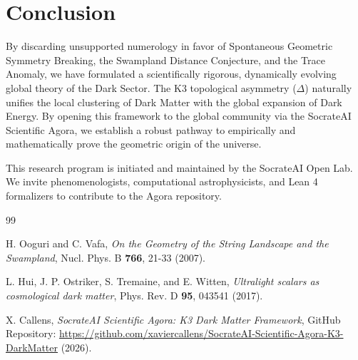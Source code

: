 \documentclass[aps,prd,twocolumn,nofootinbib,superscriptaddress,10pt]{revtex4-2}
\begin{document}
\section{Conclusion}

By discarding unsupported numerology in favor of Spontaneous Geometric Symmetry Breaking, the Swampland Distance Conjecture, and the Trace Anomaly, we have formulated a scientifically rigorous, dynamically evolving global theory of the Dark Sector. The K3 topological asymmetry ($\Delta$) naturally unifies the local clustering of Dark Matter with the global expansion of Dark Energy. By opening this framework to the global community via the SocrateAI Scientific Agora, we establish a robust pathway to empirically and mathematically prove the geometric origin of the universe.

\begin{acknowledgments}
This research program is initiated and maintained by the SocrateAI Open Lab. We invite phenomenologists, computational astrophysicists, and Lean 4 formalizers to contribute to the Agora repository.
\end{acknowledgments}


\begin{thebibliography}{99}

H. Ooguri and C. Vafa,
\textit{On the Geometry of the String Landscape and the Swampland},
Nucl. Phys. B \textbf{766}, 21-33 (2007).

L. Hui, J. P. Ostriker, S. Tremaine, and E. Witten,
\textit{Ultralight scalars as cosmological dark matter},
Phys. Rev. D \textbf{95}, 043541 (2017).

X. Callens,
\textit{SocrateAI Scientific Agora: K3 Dark Matter Framework},
GitHub Repository: \url{https://github.com/xaviercallens/SocrateAI-Scientific-Agora-K3-DarkMatter} (2026).

\end{thebibliography}
\end{document}
